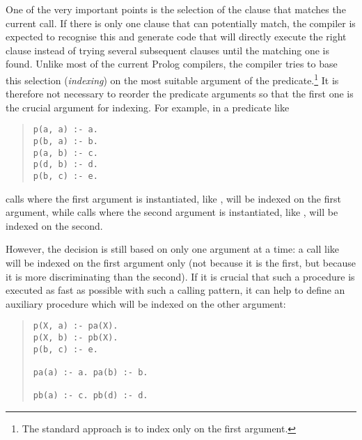 One of the very important points is the selection
of the clause that matches the current call.
If there is only one clause that can potentially match,
the compiler is expected to recognise this and generate code
that will directly execute the right clause
instead of trying several subsequent clauses until the
matching one is found.
Unlike most of the current Prolog compilers, the {\eclipse}
compiler tries to base this selection ({\it indexing}) on the most suitable
argument of the predicate.\footnote{%
         The standard approach is to index only on the first argument.}
It is therefore not necessary to reorder the predicate
arguments so that the first one is the crucial argument
for indexing. For example, in a predicate like
\begin{quote}
\begin{verbatim}
p(a, a) :- a.
p(b, a) :- b.
p(a, b) :- c.
p(d, b) :- d.
p(b, c) :- e.
\end{verbatim}
\end{quote}
calls where the first argument is instantiated, like , will be
indexed on the first argument, while calls where the second argument is
instantiated, like , will be indexed on the second.

However, the decision is still based on only one argument at a time:
a call like  will be indexed on the first argument only
(not because it is the first, but because it is more discriminating
than the second).  If it is crucial that such a procedure is executed
as fast as possible with such a calling pattern, it can help to define
an auxiliary procedure which will be indexed on the other argument:
\begin{quote}
\begin{verbatim}
p(X, a) :- pa(X).
p(X, b) :- pb(X).
p(b, c) :- e.

pa(a) :- a. pa(b) :- b.

pb(a) :- c. pb(d) :- d.
\end{verbatim}
\end{quote}


